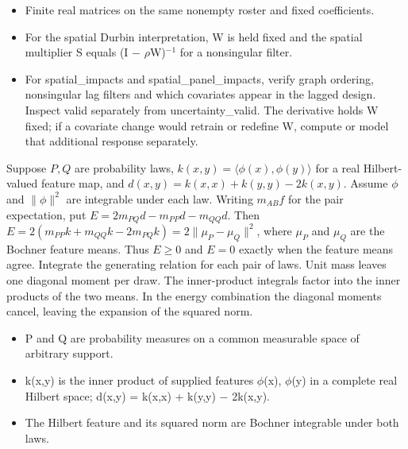 \expandafter\def\csname statadic@assumptions@STATADIC-SPATIAL-003\endcsname{\begin{itemize}
\item Finite real matrices on the same nonempty roster and fixed coefficients.
\item For the spatial Durbin interpretation, W is held fixed and the spatial multiplier S equals (I \ensuremath{-} \ensuremath{\rho}W)\ensuremath{{}^{-1}} for a nonsingular filter.
\end{itemize}}
\expandafter\def\csname statadic@diagnostics@STATADIC-SPATIAL-003\endcsname{\begin{itemize}
\item For spatial\_impacts and spatial\_panel\_impacts, verify graph ordering, nonsingular lag filters and which covariates appear in the lagged design. Inspect valid separately from uncertainty\_valid. The derivative holds W fixed; if a covariate change would retrain or redefine W, compute or model that additional response separately.
\end{itemize}}
\expandafter\def\csname statadic@statement@STATADIC-ENERGY-004\endcsname{Suppose $P,Q$ are probability laws, $k(x,y)=\langle\phi(x),\phi(y)\rangle$
  for a real Hilbert-valued feature map, and $d(x,y)=k(x,x)+k(y,y)-2k(x,y)$.
  Assume $\phi$ and $\|\phi\|^2$ are integrable under each law. Writing $m_{AB}f$
  for the pair expectation, put $E=2m_{PQ}d-m_{PP}d-m_{QQ}d$.
  Then $E=2(m_{PP}k+m_{QQ}k-2m_{PQ}k)=2\|\mu_P-\mu_Q\|^2$,
  where $\mu_P$ and $\mu_Q$ are the Bochner feature means. Thus $E\ge0$ and
  $E=0$ exactly when the feature means agree.}
\expandafter\def\csname statadic@proof@STATADIC-ENERGY-004\endcsname{Integrate the generating relation for each pair of laws. Unit
  mass leaves one diagonal moment per draw. The inner-product integrals factor
  into the inner products of the two means. In the energy combination the
  diagonal moments cancel, leaving the expansion of the squared norm.}
\expandafter\def\csname statadic@assumptions@STATADIC-ENERGY-004\endcsname{\begin{itemize}
\item P and Q are probability measures on a common measurable space of arbitrary support.
\item k(x,y) is the inner product of supplied features \ensuremath{\phi}(x), \ensuremath{\phi}(y) in a complete real Hilbert space; d(x,y) = k(x,x) + k(y,y) \ensuremath{-} 2k(x,y).
\item The Hilbert feature and its squared norm are Bochner integrable under both laws.
\end{itemize}}
